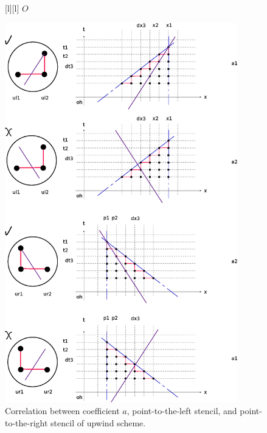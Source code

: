 \begin{figure}[ht]

	[l] {$O$}

	\includegraphics[width=0.9\textwidth]{a4casesupwind.eps}
	\caption{Correlation between coefficient $a$, point-to-the-left stencil, and point-to-the-right stencil
		of upwind scheme.}
	\label{\LABEL}
\end{figure}
